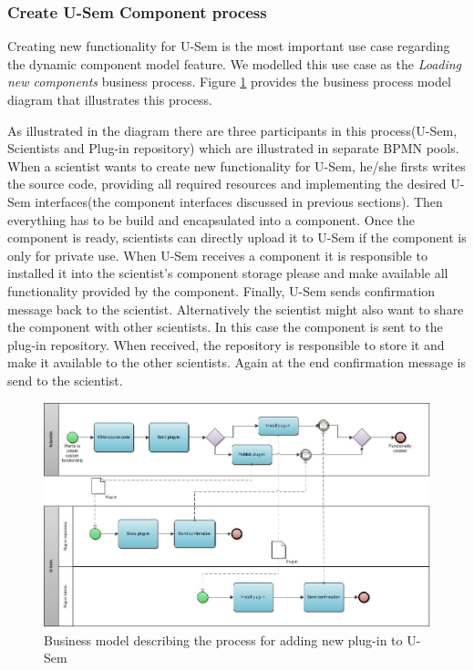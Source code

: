 \subsubsection{Create U-Sem Component process}

Creating new functionality for U-Sem is the most important use case regarding the dynamic component model feature. We modelled this use case as the \textit{Loading new components} business process. Figure \ref{fig_install_bpm} provides the business process model diagram that illustrates this process. 

As illustrated in the diagram there are three participants in this process(U-Sem, Scientists and Plug-in repository) which are illustrated in separate BPMN pools. When a scientist wants to create new functionality for U-Sem, he/she firsts writes the source code, providing all required resources and implementing the desired U-Sem interfaces(the component interfaces discussed in previous sections). Then everything has to be build and encapsulated into a component. Once the component is ready, scientists can directly upload it to U-Sem if the component is only for private use. When U-Sem receives a component it is responsible to installed it into the scientist's component storage please and make available all functionality provided by the component. Finally, U-Sem sends confirmation message back to the scientist. Alternatively the scientist might also want to share the component with other scientists. In this case the component is sent to the plug-in repository. When received, the repository is responsible to store it and make it available to the other scientists. Again at the end confirmation message is send to the scientist.

\begin{figure}[h!]
  \centering
  	\includegraphics[scale=0.7,angle=90]{plug-in/business_processes/CreatePlugInBusinessModel.jpg}
  \caption{Business model describing the process for adding new plug-in to U-Sem}
  \label{fig_install_bpm}
\end{figure}

